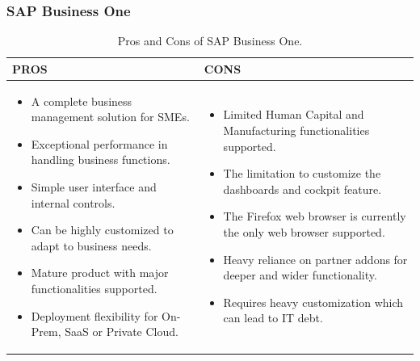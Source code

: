 \subsubsection{SAP Business One}
\begin{table}
    \centering
    \begin{tabular}{|p{}|p{}|}
        \hline
        \textbf{PROS} & \textbf{CONS}                                             \\ \hline
        \begin{itemize}
            \item A complete business management solution for SMEs.
            \item Exceptional performance in handling business functions.
            \item Simple user interface and internal controls.
            \item Can be highly customized to adapt to business needs.
            \item Mature product with major functionalities supported.
            \item Deployment flexibility for On-Prem, SaaS or Private Cloud.
        \end{itemize}
                      &
        \begin{itemize}
            \item Limited Human Capital and Manufacturing functionalities supported.
            \item The limitation to customize the dashboards and cockpit feature.
            \item The Firefox web browser is currently the only web browser supported.
            \item Heavy reliance on partner addons for deeper and wider functionality.
            \item Requires heavy customization which can lead to IT debt.
        \end{itemize} \\ \hline
    \end{tabular}
    \caption{Pros and Cons of SAP Business One.}
    \label{tab:sap_pros_cons}
\end{table}

\newpage

